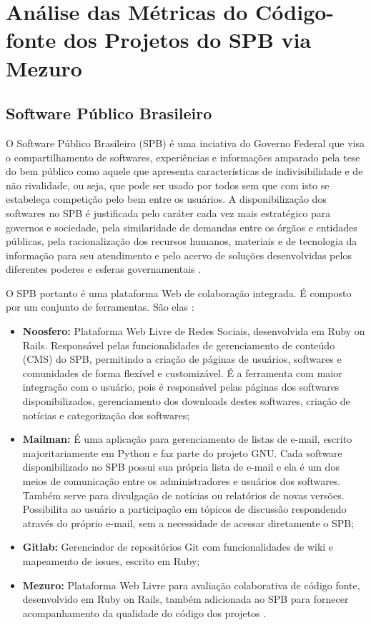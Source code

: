 \chapter{Análise das Métricas do Código-fonte dos Projetos do SPB via Mezuro}


\section{Software Público Brasileiro}

O Software Público Brasileiro (SPB) é uma inciativa do Governo Federal que visa
o compartilhamento de softwares, experiências e informações amparado pela tese
do bem público como aquele que apresenta características de indivisibilidade e
de não rivalidade, ou seja, que pode ser usado por todos sem que com isto se
estabeleça competição pelo bem entre os usuários. A disponibilização dos
softwares no SPB é justificada pelo caráter cada vez mais estratégico para
governos e sociedade, pela similaridade de demandas entre os órgãos e entidades
públicas, pela racionalização dos recursos humanos, materiais e de tecnologia
da informação para seu atendimento e pelo acervo de soluções desenvolvidas
pelos diferentes poderes e esferas governamentais \cite{santos2011in01}.

O SPB portanto é uma plataforma Web de colaboração integrada. É composto por um
conjunto de ferramentas. São elas \cite{aboutSPB}:

\begin{itemize}
  \item \textbf{Noosfero:} Plataforma Web Livre de Redes Sociais, desenvolvida
	em Ruby on Rails. Responsável pelas funcionalidades de gerenciamento de
	conteúdo (CMS) do SPB, permitindo a criação de páginas de usuários, softwares
	e comunidades de forma flexível e customizável. É a ferramenta com maior
	integração com o usuário, pois é responsável pelas páginas dos softwares
	disponibilizados, gerenciamento dos downloads destes softwares, criação de
	notícias e categorização dos softwares;
  \item \textbf{Mailman:} É uma aplicação para gerenciamento de listas de
	e-mail, escrito majoritariamente em Python e faz parte do projeto GNU. Cada
	software disponibilizado no SPB possui sua própria lista de e-mail e ela é um
	dos meios de comunicação entre os administradores e usuários dos softwares.
	Também serve para divulgação de notícias ou relatórios de novas versões.
	Possibilita ao usuário a participação em tópicos de discussão respondendo
	através do próprio e-mail, sem a necessidade de acessar diretamente o SPB;
	\item \textbf{Gitlab:} Gerenciador de repositórios Git com funcionalidades de
	wiki e mapeamento de issues, escrito em Ruby;
	\item \textbf{Mezuro:} Plataforma Web Livre para avaliação colaborativa de
	código fonte, desenvolvido em Ruby on Rails, também adicionada ao SPB para
	fornecer acompanhamento da qualidade do código dos projetos \cite{aboutSPB}.
\end{itemize}

